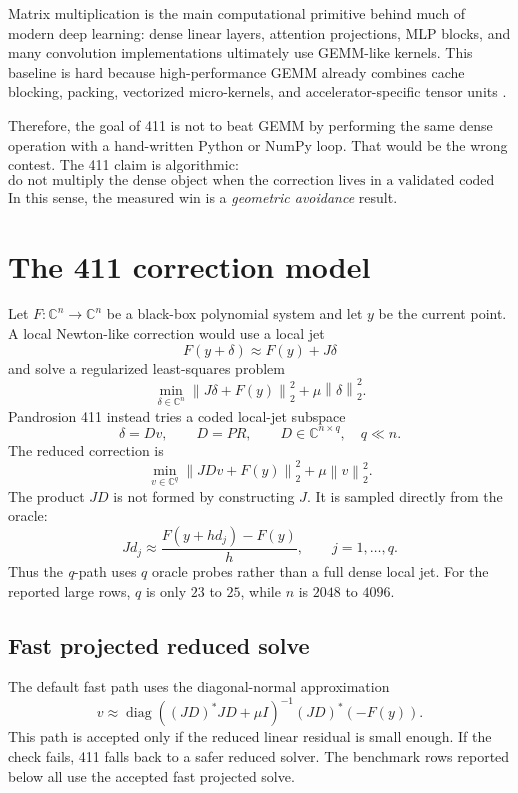\documentclass[11pt]{article}
\newcommand{\C}{\mathbb C}
\newcommand{\norm}[1]{\left\lVert #1\right\rVert}
\newcommand{\qpath}{\textit{q}\nobreakdash-path}
\newcommand{\diag}{\operatorname{diag}}
\begin{document}
Matrix multiplication is the main computational primitive behind much of
modern deep learning: dense linear layers, attention projections, MLP blocks,
and many convolution implementations ultimately use GEMM-like kernels.  This
baseline is hard because high-performance GEMM already combines cache blocking,
packing, vectorized micro-kernels, and accelerator-specific tensor units
\cite{gotoblas,blis,cutlass}.

Therefore, the goal of 411 is not to beat GEMM by performing the same dense
operation with a hand-written Python or NumPy loop.  That would be the wrong
contest.  The 411 claim is algorithmic:
\[
        \text{do not multiply the dense object when the correction lives in a
        validated coded subspace.}
\]
In this sense, the measured win is a \emph{geometric avoidance} result.

\section{The 411 correction model}

Let \(F:\C^n\to\C^n\) be a black-box polynomial system and let \(y\) be the
current point.  A local Newton-like correction would use a local jet
\[
        F(y+\delta)\approx F(y)+J\delta
\]
and solve a regularized least-squares problem
\[
        \min_{\delta\in\C^n}
        \norm{J\delta+F(y)}_2^2+\mu\norm{\delta}_2^2.
\]
Pandrosion 411 instead tries a coded local-jet subspace
\[
        \delta = Dv,\qquad D=P R,\qquad D\in\C^{n\times q},\quad q\ll n.
\]
The reduced correction is
\[
        \min_{v\in\C^q}
        \norm{J D v+F(y)}_2^2+\mu\norm{v}_2^2.
\]
The product \(J D\) is not formed by constructing \(J\).  It is sampled directly
from the oracle:
\[
        J d_j \approx \frac{F(y+h d_j)-F(y)}{h},
        \qquad j=1,\ldots,q.
\]
Thus the \qpath{} uses \(q\) oracle probes rather than a full dense local jet.
For the reported large rows, \(q\) is only \(23\) to \(25\), while \(n\) is
\(2048\) to \(4096\).

\subsection{Fast projected reduced solve}

The default fast path uses the diagonal-normal approximation
\[
        v \approx
        \diag\!\left((JD)^*JD+\mu I\right)^{-1}(JD)^*(-F(y)).
\]
This path is accepted only if the reduced linear residual is small enough.  If
the check fails, 411 falls back to a safer reduced solver.  The benchmark rows
reported below all use the accepted fast projected solve.
\end{document}
